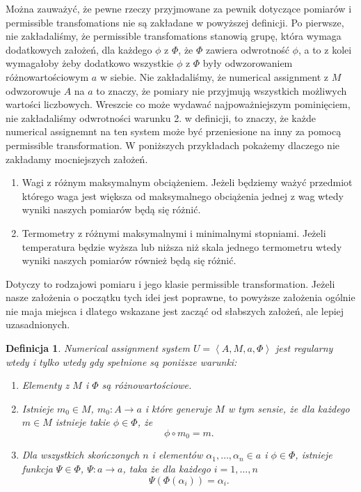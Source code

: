 \documentclass[12pt,a4paper]{report}
\newtheorem{definition}{Definicja}[chapter]
\newcommand{\tuple}[1]{\left\langle {#1} \right\rangle}
\begin{document}
  Można zauważyć, że pewne rzeczy przyjmowane za pewnik dotyczące pomiarów i permissible transfomations  nie są zakładane w powyższej definicji. Po pierwsze, nie zakładaliśmy, że permissible transfomations stanowią grupę, która wymaga dodatkowych założeń, dla każdego $\phi$ z $\Phi$, że $\Phi$ zawiera odwrotność $\phi$, a to z kolei wymagałoby żeby dodatkowo wszystkie $\phi$ z $\Phi$ były odwzorowaniem różnowartościowym $a$ w siebie. Nie zakładaliśmy, że numerical assignment z $M$ odwzorowuje $A$ na $a$ to znaczy, że pomiary nie przyjmują wszystkich  możliwych wartości liczbowych. Wreszcie co może wydawać najpoważniejszym pominięciem, nie zakładaliśmy odwrotności warunku 2. w definicji, to znaczy, że każde numerical assignemnt na ten system może być przeniesione na inny za pomocą permissible transformation. W poniższych przykładach pokażemy dlaczego nie zakładamy mocniejszych założeń.
\begin{enumerate}
\item
Wagi z różnym maksymalnym obciążeniem. Jeżeli będziemy ważyć przedmiot którego waga jest większa od maksymalnego obciążenia jednej z wag wtedy wyniki naszych pomiarów będą się różnić. 
\item
Termometry z różnymi maksymalnymi i minimalnymi stopniami. Jeżeli temperatura będzie wyższa lub niższa niż skala jednego termometru wtedy wyniki naszych pomiarów również będą się różnić.
\end{enumerate}  
   Dotyczy to rodzajowi pomiaru i jego klasie permissible transformation. Jeżeli nasze założenia o początku tych idei jest poprawne, to powyższe założenia ogólnie nie maja miejsca i dlatego wskazane jest zacząć od słabszych założeń, ale lepiej uzasadnionych.  
\begin{definition}
Numerical assignment system $U=\tuple{A, M, a, \Phi}$ jest regularny wtedy i tylko wtedy gdy spełnione są poniższe warunki:
\begin{enumerate}
\item
Elementy z $M$ i $\Phi$ są różnowartościowe.
\item
Istnieje $m_{0}\in M$, $m_0:A\to a$ i które generuje $M$ w tym sensie, że dla każdego $m\in M$ istnieje takie $\phi\in \Phi$, że
$$
\phi \circ m_{0}=m.
$$
\item
Dla wszystkich skończonych $n$ i elementów $\alpha_{1},\dots,\alpha_{n}\in a$ i  $\phi\in \Phi$, istnieje funkcja $\Psi\in \Phi$, $\Psi:a\to a$, taka że dla każdego $i=1,\ldots,n$ 
$$
\Psi(\Phi(\alpha_{i}))=\alpha_{i}.
$$
\end{enumerate}
\end{definition}
\end{document}
